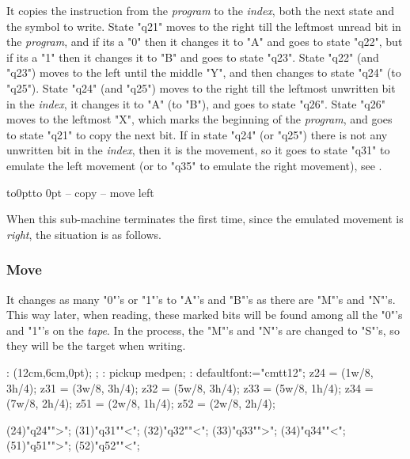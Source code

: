 It copies the instruction from the {\em program} to the {\em index},
both the next state and the symbol to write.
State "q21" moves to the right till
 the leftmost unread bit in the {\em program},
and if its a "0" then it changes it to "A" and goes to state "q22",
but if its a "1" then it changes it to "B" and goes to state "q23".
State "q22" (and "q23") moves to the left until the middle "Y",
and then changes to state "q24" (to "q25").
State "q24" (and "q25") moves to the right till
 the leftmost unwritten bit in the {\em index},
it changes it to "A" (to "B"), and goes to state "q26".
State "q26" moves to the leftmost "X", which marks the beginning
of the {\em program}, and goes to state "q21" to copy the next bit.
If in state "q24" (or "q25") there is not any unwritten bit
 in the {\em index}, then it is the movement,
so it goes to state "q31" to emulate the left movement
(or to "q35" to emulate the right movement), see .
\par\kern-12pt\vbox to0pt{\kern14.4pt\hbox to 0pt{\kern4cm\box\MTbox\hss}\vss}
-- copy
-- move left

When this sub-machine terminates the first time,
since the emulated movement is {\em right},
the situation is as follows.

\nextsituation

\vfill\break


\subsubsection{Move}

It changes as many "0"'s or "1"'s to "A"'s and "B"'s
as there are "M"'s and "N"'s. This way later, when reading,
these marked bits will be found among all the "0"'s and "1"'s
on the {\em tape}.
In the process, the "M"'s and "N"'s are changed to "S"'s,
so they will be the target when writing.

\MT:
\MTbeginfig(12cm,6cm,0pt);
\MTresetpa;
\MT: pickup medpen;
\MT: defaultfont:="cmtt12";
\MTcode
 z24 = (1w/8, 3h/4);
 z31 = (3w/8, 3h/4);
 z32 = (5w/8, 3h/4);
 z33 = (5w/8, 1h/4);
 z34 = (7w/8, 2h/4);
 z51 = (2w/8, 1h/4);
 z52 = (2w/8, 2h/4);

\MTstate(24)"q24"">";
\MTstate(31)"q31""<";
\MTstate(32)"q32""<";
\MTstate(33)"q33"">";
\MTstate(34)"q34""<";
\MTstate(51)"q51"">";
\MTstate(52)"q52""<";

